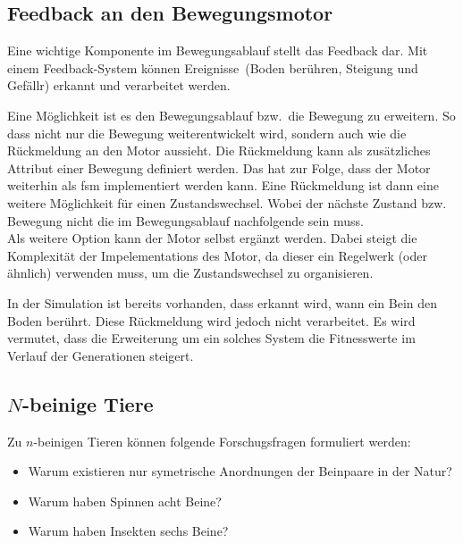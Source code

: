     \subsection{Feedback an den Bewegungsmotor\label{sub:PerspectiveFeedback}}

      Eine wichtige Komponente im Bewegungsablauf stellt das Feedback dar.
      Mit einem Feedback-System können Ereignisse~(Boden berühren, Steigung und Gefällr) erkannt und verarbeitet werden.

      \smallskip

      Eine Möglichkeit ist es den Bewegungsablauf bzw.\ die Bewegung zu erweitern.
      So dass nicht nur die Bewegung weiterentwickelt wird, sondern auch wie die Rückmeldung an den Motor aussieht.
      Die Rückmeldung kann als zusätzliches Attribut einer Bewegung definiert werden.
      Das hat zur Folge, dass der Motor weiterhin als \acrshort{fsm} implementiert werden kann.
      Eine Rückmeldung ist dann eine weitere Möglichkeit für einen Zustandswechsel.
      Wobei der nächste Zustand bzw. Bewegung nicht die im Bewegungsablauf nachfolgende sein muss.
      \\
      Als weitere Option kann der Motor selbst ergänzt werden.
      Dabei steigt die Komplexität der Impelementations des Motor,
      da dieser ein Regelwerk (oder ähnlich) verwenden muss, um die Zustandswechsel zu organisieren.

      \smallskip

      In der Simulation ist bereits vorhanden, dass erkannt wird, wann ein Bein den Boden berührt.
      Diese Rückmeldung wird jedoch nicht verarbeitet.
      Es wird vermutet,
      dass die Erweiterung um ein solches System die Fitnesswerte im Verlauf der Generationen steigert.

    \subsection{\(N\)-beinige Tiere}

      Zu \(n\)-beinigen Tieren können folgende Forschugsfragen formuliert werden:

      \begin{itemize}

        \item Warum existieren nur symetrische Anordnungen der Beinpaare in der Natur?

        \item Warum haben Spinnen acht Beine?

        \item Warum haben Insekten sechs Beine?

      \end{itemize}


